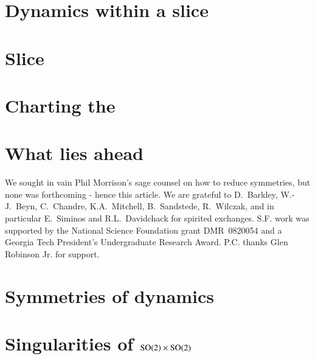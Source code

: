 \documentclass[final,3p,times,sort&compress]{elsarticle}	%
\begin{document}
\section{\Mframes}
    \label{sec:frame}
    

\section{Dynamics within a slice}
    \label{sec:mslices}
    

\section{Slice {\sset}}
	\label{sec:singul}
    

\section{Charting the \reducedsp}
	\label{sec:chart}
    

\section{What lies ahead} %
    \label{sec:concl}
    

	\medskip
We sought in vain Phil Morrison's sage counsel on how to reduce
symmetries, but none was forthcoming - hence this article. We are
grateful to
D.~Barkley,
W.-J.~Beyn,
C.~Chandre,
K.A.~Mitchell,
B.~Sandstede,
R.~Wilczak,
and in particular E.~Siminos and R.L.~Davidchack
for spirited exchanges.
S.F. work was supported by the National Science Foundation grant
DMR~0820054 and a Georgia Tech President's Undergraduate Research Award.
P.C. thanks Glen Robinson Jr. for support. 	
\appendix
\section{Symmetries of dynamics}
	\label{sec:SymmDyn}
    
\section{Singularities of $\textrm{SO}(2) \times \textrm{SO}(2)$}
	\label{sec:singulProd}
    



\ifboyscout
\newpage
\fi
\PublicPrivate{}{
    
	} %
\end{document}
